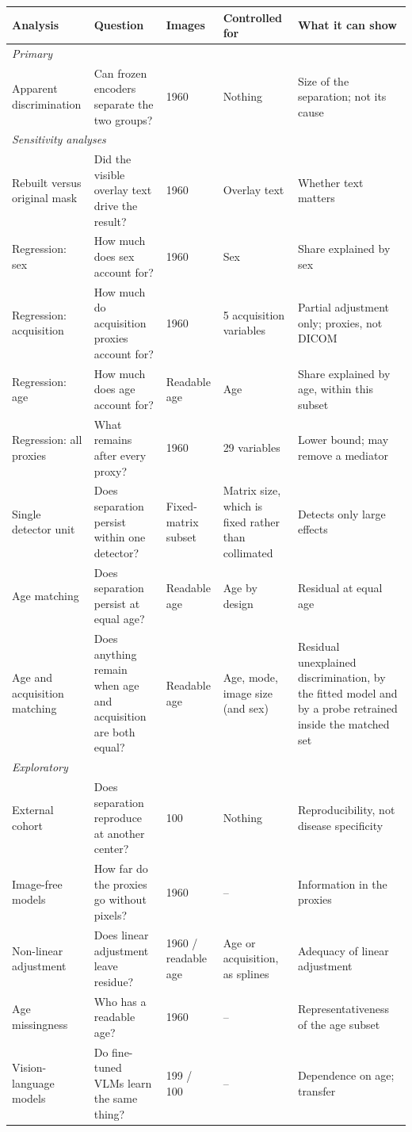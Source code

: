 \begin{tabular}{p{2.15cm}p{2.95cm}p{1.75cm}p{2.15cm}p{2.8cm}}
\toprule
Analysis & Question & Images & Controlled for & What it can show \\
\midrule
\multicolumn{5}{l}{\emph{Primary}} \\
Apparent discrimination & Can frozen encoders separate the two groups? & 1960 & Nothing & Size of the separation; not its cause \\
\midrule
\multicolumn{5}{l}{\emph{Sensitivity analyses}} \\
Rebuilt versus original mask & Did the visible overlay text drive the result? & 1960 & Overlay text & Whether text matters \\
Regression: sex & How much does sex account for? & 1960 & Sex & Share explained by sex \\
Regression: acquisition & How much do acquisition proxies account for? & 1960 & 5 acquisition variables & Partial adjustment only; proxies, not DICOM \\
Regression: age & How much does age account for? & Readable age & Age & Share explained by age, within this subset \\
Regression: all proxies & What remains after every proxy? & 1960 & 29 variables & Lower bound; may remove a mediator \\
Single detector unit & Does separation persist within one detector? & Fixed-matrix subset & Matrix size, which is fixed rather than collimated & Detects only large effects \\
Age matching & Does separation persist at equal age? & Readable age & Age by design & Residual at equal age \\
Age and acquisition matching & Does anything remain when age and acquisition are both equal? & Readable age & Age, mode, image size (and sex) & Residual unexplained discrimination, by the fitted model and by a probe retrained inside the matched set \\
\midrule
\multicolumn{5}{l}{\emph{Exploratory}} \\
External cohort & Does separation reproduce at another center? & 100 & Nothing & Reproducibility, not disease specificity \\
Image-free models & How far do the proxies go without pixels? & 1960 & -- & Information in the proxies \\
Non-linear adjustment & Does linear adjustment leave residue? & 1960 / readable age & Age or acquisition, as splines & Adequacy of linear adjustment \\
Age missingness & Who has a readable age? & 1960 & -- & Representativeness of the age subset \\
Vision-language models & Do fine-tuned VLMs learn the same thing? & 199 / 100 & -- & Dependence on age; transfer \\
\bottomrule
\end{tabular}
